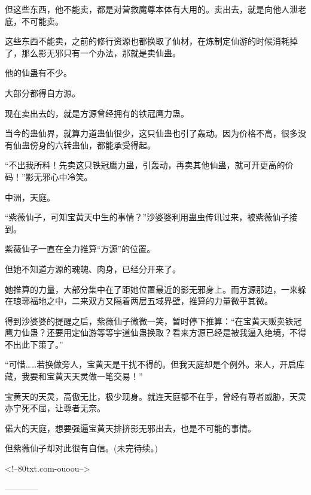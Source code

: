 \begin{this_body}
但这些东西，他不能卖，都是对营救魔尊本体有大用的。卖出去，就是向他人泄老底，不可能卖。

这些东西不能卖，之前的修行资源也都换取了仙材，在炼制定仙游的时候消耗掉了，那么影无邪只有一个办法，那就是卖仙蛊。

他的仙蛊有不少。

大部分都得自方源。

现在卖出去的，就是方源曾经拥有的铁冠鹰力蛊。

当今的蛊仙界，就算力道蛊仙很少，这只仙蛊也引了轰动。因为价格不高，很多没有仙蛊傍身的六转蛊仙，都能承受得起。

“不出我所料！先卖这只铁冠鹰力蛊，引轰动，再卖其他仙蛊，就可开更高的价码！”影无邪心中冷笑。

中洲，天庭。

“紫薇仙子，可知宝黄天中生的事情？”沙婆婆利用蛊虫传讯过来，被紫薇仙子接到。

紫薇仙子一直在全力推算“方源”的位置。

但她不知道方源的魂魄、肉身，已经分开来了。

她推算的力量，大部分集中在了距她位置最近的影无邪身上。而方源那边，一来躲在琅琊福地之中，二来双方又隔着两层五域界壁，推算的力量微乎其微。

得到沙婆婆的提醒之后，紫薇仙子微微一笑，暂时停下推算：“在宝黄天贩卖铁冠鹰力仙蛊？还要用定仙游等等宇道仙蛊换取？看来方源已经是被我逼入绝境，不得不出此下策了。”

“可惜……若换做旁人，宝黄天是干扰不得的。但我天庭却是个例外。来人，开启库藏，我要和宝黄天天灵做一笔交易！”

宝黄天的天灵，高傲无比，极少现身。就连天庭都不在乎，曾经有尊者威胁，天灵亦宁死不屈，让尊者无奈。

偌大的天庭，想要强逼宝黄天排挤影无邪出去，也是不可能的事情。

但紫薇仙子却对此很有自信。(未完待续。)

<!--80txt.com-ouoou-->

------------

\end{this_body}

